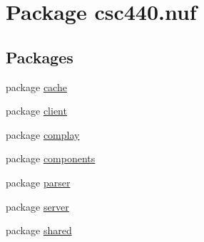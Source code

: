\hypertarget{namespacecsc440_1_1nuf}{\section{Package csc440.\-nuf}
\label{namespacecsc440_1_1nuf}
}
\subsection*{Packages}
\begin{DoxyCompactItemize}
\item 
package \hyperlink{namespacecsc440_1_1nuf_1_1cache}{cache}
\item 
package \hyperlink{namespacecsc440_1_1nuf_1_1client}{client}
\item 
package \hyperlink{namespacecsc440_1_1nuf_1_1complay}{complay}
\item 
package \hyperlink{namespacecsc440_1_1nuf_1_1components}{components}
\item 
package \hyperlink{namespacecsc440_1_1nuf_1_1parser}{parser}
\item 
package \hyperlink{namespacecsc440_1_1nuf_1_1server}{server}
\item 
package \hyperlink{namespacecsc440_1_1nuf_1_1shared}{shared}
\end{DoxyCompactItemize}
